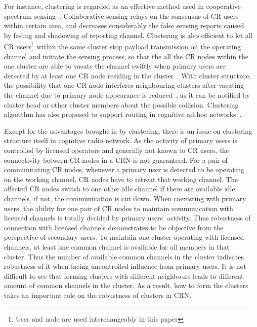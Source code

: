 For instance, clustering is regarded as an effective method used in cooperative spectrum sensing~\cite{Sun07_clustering_spectrum_secsing, Zhao07}.
Collaborative sensing relays on the consensus of CR users within certain area, and decreases considerably the false sensing reports caused by fading and shadowing of reporting channel.
Clustering is also efficient to let all CR users\footnote{User and node are used interchangeably in this paper} within the same cluster stop payload transmission on the operating channel and initiate the sensing process, so that the all the CR nodes within the one cluster are able to vacate the channel swiftly when primary users are detected by at least one CR node residing in the cluster~\cite{willkomm08}.
With cluster structure, the possibility that one CR node interferes neighbouring clusters after vacating the channel due to primary node appearance is reduced~\cite{centralizedSharing80222}, as it can be notified by cluster head or other cluster members about the possible collision. 
Clustering algorithm has also proposed to support routing in cognitive ad-hoc networks~\cite{Abbasi_survey_07}.


Except for the advantages brought in by clustering, there is an issue on clustering structure itself in cognitive radio network.
As the activity of primary users is controlled by licensed operators and generally not known to CR users, the connectivity between CR nodes in a CRN is not guaranteed. 
For a pair of communicating CR nodes, whenever a primary user is detected to be operating on the working channel, CR nodes have to retreat that working channel.
The affected CR nodes switch to one other idle channel if there are available idle channels, if not, the communication is cut down.
When coexisting with primary users, the ability for one pair of CR nodes to maintain communication with licensed channels is totally decided by primary users' activity.
Thus robustness of connection with licensed channels demonstrates to be objective from the perspective of secondary users.
To maintain one cluster operating with licensed channels, at least one common channel is available for all members in that cluster.
Thus the number of available common channels in the cluster indicates robustness of it when facing uncontrolled influence from primary users.
It is not difficult to see that forming clusters with different neighbours leads to different amount of common channels in the cluster.
As a result, how to form the clusters takes an important role on the robustness of clusters in CRN.

